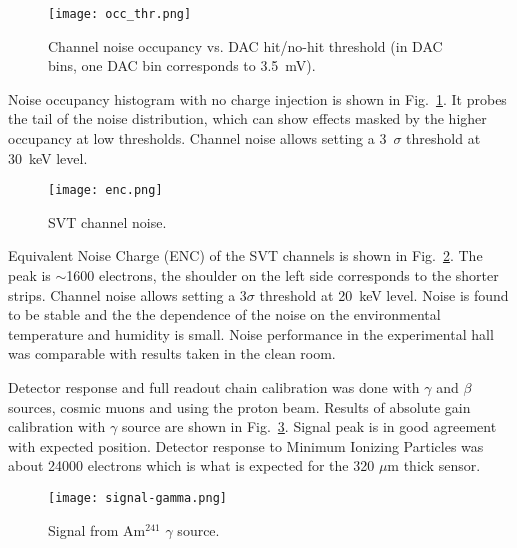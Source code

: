 \begin{figure}[hbt] 
\centering 
\texttt{[image: occ\_thr.png]}
\caption{Channel noise occupancy vs. DAC hit/no-hit threshold (in DAC bins, one DAC bin corresponds to 3.5~mV).}
\label{fig:noiseocc}
\end{figure}

Noise occupancy histogram with no charge injection is shown in Fig.~\ref{fig:noiseocc}. It probes the tail of the noise distribution, which can show effects masked by the higher occupancy at low thresholds. Channel noise allows setting a 3~$\sigma$ threshold at 30~keV level. 

\begin{figure}[hbt] 
	\centering 
	\texttt{[image: enc.png]}
	\caption{SVT channel noise.}
	\label{fig:enc}
\end{figure}

Equivalent Noise Charge (ENC) of the SVT channels is shown in  Fig.~\ref{fig:enc}. The peak is $\sim$1600 electrons, the shoulder on the left side corresponds to the shorter strips. Channel noise allows setting a 3$\sigma$ threshold at 20~keV level. Noise is found to be stable and the the dependence of the noise on the environmental temperature and humidity is small. Noise performance in the experimental hall was comparable with results taken in the clean room. 

Detector response and full readout chain calibration was done with $\gamma$ and $\beta$ sources, cosmic muons and using the proton beam. Results of absolute gain calibration with $\gamma$ source are shown in Fig.~\ref{fig:signal-gamma}. Signal peak is in good agreement with expected position. Detector response to Minimum Ionizing Particles was about 24000 electrons which is what is expected for the 320 $\mu$m thick sensor.

\begin{figure}[hbt] 
	\centering 
	\texttt{[image: signal-gamma.png]}
	\caption{Signal from Am$^{241}$ $\gamma$ source.}
	\label{fig:signal-gamma}
\end{figure}

%
%

